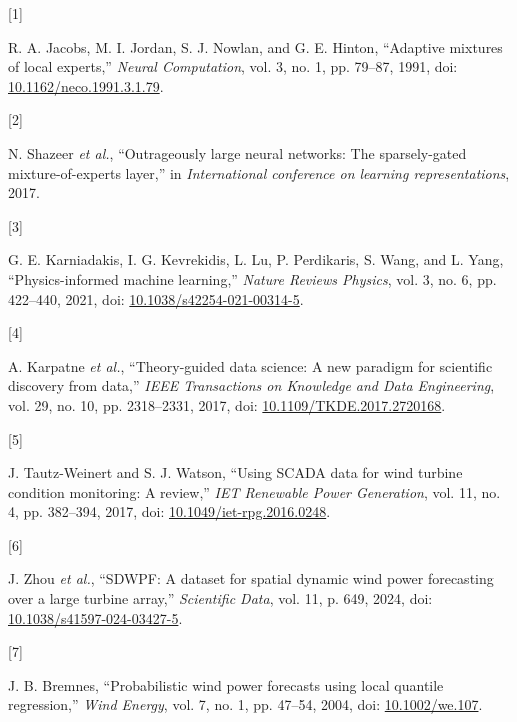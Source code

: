 \documentclass[
  journal]{IEEEtran}
\newlength{\cslhangindent}
\newlength{\csllabelwidth}
\newenvironment{CSLReferences}[2] %
 {\begin{list}{}{%
  \setlength{\itemindent}{0pt}
  \setlength{\leftmargin}{0pt}
  \setlength{\parsep}{0pt}
  \ifodd #1
   \setlength{\leftmargin}{\cslhangindent}
   \setlength{\itemindent}{-1\cslhangindent}
  \fi
  \setlength{\itemsep}{#2\baselineskip}}}
 {\end{list}}
\newcommand{\CSLLeftMargin}[1]{\parbox[t]{\csllabelwidth}{\strut#1\strut}}
\newcommand{\CSLRightInline}[1]{\parbox[t]{\linewidth - \csllabelwidth}{\strut#1\strut}}
\begin{document}
\protect{}\label{refs}
\begin{CSLReferences}{0}{0}
\CSLLeftMargin{{[}1{]} }%
\CSLRightInline{R. A. Jacobs, M. I. Jordan, S. J. Nowlan, and G. E.
Hinton, {``Adaptive mixtures of local experts,''} \emph{Neural
Computation}, vol. 3, no. 1, pp. 79--87, 1991, doi:
\href{https://doi.org/10.1162/neco.1991.3.1.79}{10.1162/neco.1991.3.1.79}.}

\CSLLeftMargin{{[}2{]} }%
\CSLRightInline{N. Shazeer \emph{et al.}, {``Outrageously large neural
networks: The sparsely-gated mixture-of-experts layer,''} in
\emph{International conference on learning representations}, 2017.}

\CSLLeftMargin{{[}3{]} }%
\CSLRightInline{G. E. Karniadakis, I. G. Kevrekidis, L. Lu, P.
Perdikaris, S. Wang, and L. Yang, {``Physics-informed machine
learning,''} \emph{Nature Reviews Physics}, vol. 3, no. 6, pp. 422--440,
2021, doi:
\href{https://doi.org/10.1038/s42254-021-00314-5}{10.1038/s42254-021-00314-5}.}

\CSLLeftMargin{{[}4{]} }%
\CSLRightInline{A. Karpatne \emph{et al.}, {``Theory-guided data
science: A new paradigm for scientific discovery from data,''}
\emph{IEEE Transactions on Knowledge and Data Engineering}, vol. 29, no.
10, pp. 2318--2331, 2017, doi:
\href{https://doi.org/10.1109/TKDE.2017.2720168}{10.1109/TKDE.2017.2720168}.}

\CSLLeftMargin{{[}5{]} }%
\CSLRightInline{J. Tautz-Weinert and S. J. Watson, {``Using SCADA data
for wind turbine condition monitoring: A review,''} \emph{IET Renewable
Power Generation}, vol. 11, no. 4, pp. 382--394, 2017, doi:
\href{https://doi.org/10.1049/iet-rpg.2016.0248}{10.1049/iet-rpg.2016.0248}.}

\CSLLeftMargin{{[}6{]} }%
\CSLRightInline{J. Zhou \emph{et al.}, {``SDWPF: A dataset for spatial
dynamic wind power forecasting over a large turbine array,''}
\emph{Scientific Data}, vol. 11, p. 649, 2024, doi:
\href{https://doi.org/10.1038/s41597-024-03427-5}{10.1038/s41597-024-03427-5}.}

\CSLLeftMargin{{[}7{]} }%
\CSLRightInline{J. B. Bremnes, {``Probabilistic wind power forecasts
using local quantile regression,''} \emph{Wind Energy}, vol. 7, no. 1,
pp. 47--54, 2004, doi:
\href{https://doi.org/10.1002/we.107}{10.1002/we.107}.}


\end{CSLReferences}
\end{document}
